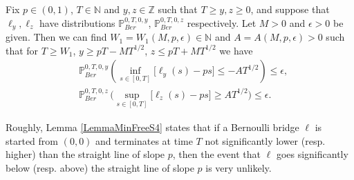 \begin{lemma}\label{LemmaMinFreeS4} Fix $p \in (0,1)$, $T \in \mathbb{N}$ and $y,z\in \mathbb{Z}$ such that $T \geq y,z \geq 0$, and suppose that $\ell_y,\ell_z$ have distributions $\mathbb{P}^{0,T,0,y}_{Ber}$, $\mathbb{P}^{0,T,0,z}_{Ber}$ respectively. Let $M > 0$ and $\epsilon > 0$ be given. Then we can find $W_1=W_1(M,p, \epsilon) \in \mathbb{N}$ and $A=A(M,p, \epsilon) > 0$ such that for $T \geq W_1$, $ y \geq p T -  MT^{1/2}$, $z \leq pT + MT^{1/2}$ we have
\begin{equation}\label{minFree1S4}
\begin{split}
&\mathbb{P}^{0,T,0,y}_{Ber}\left( \inf_{s \in [ 0, T]}\big[ \ell_y(s) -  ps \big] \leq -AT^{1/2} \right) \leq \epsilon, \\ &\mathbb{P}^{0,T,0,z}_{Ber}\,\bigg( \sup_{s \in [ 0, T]}\big[ \ell_z(s) -  ps \big] \geq AT^{1/2} \bigg) \leq \epsilon.
\end{split}
\end{equation}
\end{lemma}
\begin{remark} Roughly, Lemma \ref{LemmaMinFreeS4} states that if a Bernoulli bridge $\ell$ is started from $(0,0)$ and terminates at time $T$ not significantly lower (resp. higher) than the straight line of slope $p$, then the event that $\ell$ goes significantly below (resp. above) the straight line of slope $p$ is very unlikely.
\end{remark}
